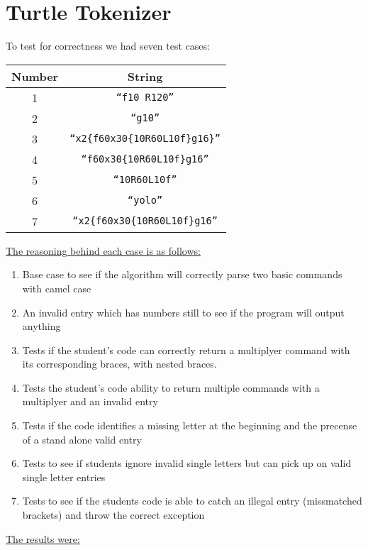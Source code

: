 \documentclass[12pt]{article}
\begin{document}
\section{Turtle Tokenizer}
To test for correctness we had seven test cases:
\begin{table}[H]
	\centering
	\begin{tabular}{cc}
		\toprule
		Number & String \\
		\midrule
		1 & \texttt{``f10 R120''} \\
		2 & \texttt{``g10''} \\
		3 & \texttt{``x2\{f60x30\{10R60L10f\}g16\}''} \\
		4 & \texttt{``f60x30\{10R60L10f\}g16''} \\
		5 & \texttt{``10R60L10f''} \\
		6 & \texttt{``yolo''} \\
		7 & \texttt{``x2\{f60x30\{10R60L10f\}g16''} \\
		\bottomrule
	\end{tabular}
\end{table}
\noindent \underline{The reasoning behind each case is as follows:}
\begin{enumerate}
\item Base case to see if the algorithm will correctly parse two basic commands with camel case
\item An invalid entry which has numbers still to see if the program will output anything
\item Tests if the student's code can correctly return a multiplyer command with its
corresponding braces, with nested braces.
\item Tests the student's code ability to return multiple commands with a multiplyer and an
invalid entry
\item Tests if the code identifies a missing letter at the beginning and the precense of a
stand alone valid entry
\item Tests to see if students ignore invalid single letters but can pick up on valid single
letter entries
\item Tests to see if the students code is able to catch an illegal entry (missmatched brackets)
and throw the correct exception
\end{enumerate}
\newpage
\underline{The results were:}
\end{document}
